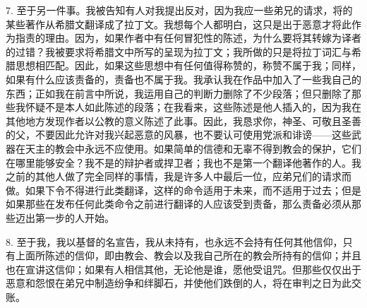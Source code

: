 7. 至于另一件事。我被告知有人对我提出反对，因为我应一些弟兄的请求，将的某些著作从希腊文翻译成了拉丁文。我想每个人都明白，这只是出于恶意才将此作为指责的理由。因为，如果作者中有任何冒犯性的陈述，为什么要将其转嫁为译者的过错？我被要求将希腊文中所写的呈现为拉丁文；我所做的只是将拉丁词汇与希腊思想相匹配。因此，如果这些思想中有任何值得称赞的，称赞不属于我；同样，如果有什么应该责备的，责备也不属于我。我承认我在作品中加入了一些我自己的东西；正如我在前言中所说，我运用自己的判断力删除了不少段落；但只删除了那些我怀疑不是本人如此陈述的段落；在我看来，这些陈述是他人插入的，因为我在其他地方发现作者以公教的意义陈述了此事。因此，我恳求你，神圣、可敬且圣善的父，不要因此允许对我兴起恶意的风暴，也不要认可使用党派和诽谤——这些武器在天主的教会中永远不应使用。如果简单的信德和无辜不得到教会的保护，它们在哪里能够安全？我不是的辩护者或捍卫者；我也不是第一个翻译他著作的人。我之前的其他人做了完全同样的事情，我是许多人中最后一位，应弟兄们的请求而做。如果下令不得进行此类翻译，这样的命令适用于未来，而不适用于过去；但是如果那些在发布任何此类命令之前进行翻译的人应该受到责备，那么责备必须从那些迈出第一步的人开始。\par

8. 至于我，我以基督的名宣告，我从未持有，也永远不会持有任何其他信仰，只有上面所陈述的信仰，即由教会、教会以及我自己所在的教会所持有的信仰；并且也在宣讲这信仰；如果有人相信其他，无论他是谁，愿他受诅咒。但那些仅仅出于恶意和怨恨在弟兄中制造纷争和绊脚石，并使他们跌倒的人，将在审判之日为此交账。\par


